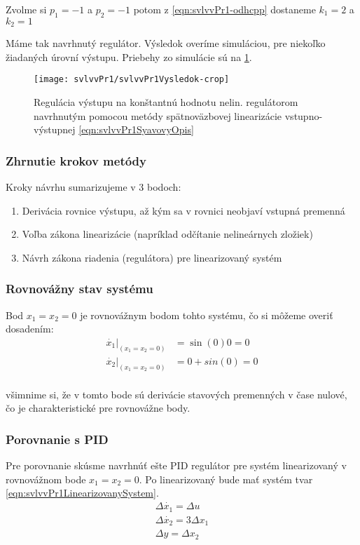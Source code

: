 \documentclass[../main.tex]{subfiles}
\begin{document}
    Zvolme si $p_1 = -1$ a $p_2 = -1$ potom z \cref{eqn:svlvvPr1-odhcpp} dostaneme $k_1=2$ a $k_2 = 1$

	Máme tak navrhnutý regulátor. Výsledok overíme simuláciou, pre niekoľko žiadaných úrovní výstupu. Priebehy zo simulácie sú na \cref{fig:svlvvPr1Vysledok}.
	\begin{figure}[h!]
		\centering
		\texttt{[image: svlvvPr1/svlvvPr1Vysledok-crop]}
		\caption{Regulácia výstupu na konštantnú hodnotu nelin. regulátorom navrhnutým pomocou metódy spätnoväzbovej linearizácie vstupno-výstupnej \cref{eqn:svlvvPr1SyavovyOpis}}
		\label{fig:svlvvPr1Vysledok}
	\end{figure}

    \subsubsection{Zhrnutie krokov metódy}
    Kroky návrhu sumarizujeme v 3 bodoch:
    \begin{enumerate}
        \item Derivácia rovnice výstupu, až kým sa v rovnici neobjaví vstupná premenná
        \item Voľba zákona linearizácie (napríklad odčítanie nelineárnych zložiek)
        \item Návrh zákona riadenia (regulátora) pre linearizovaný systém
    \end{enumerate}

    \subsubsection{Rovnovážny stav systému}
    Bod $x_1 = x_2 = 0$ je rovnovážnym bodom tohto systému, čo si môžeme overiť dosadením:
	\begin{equation*}
	    \begin{aligned}
            \dot{x_1}|_{(x_1 = x_2 = 0)} &= \sin(0) 0 = 0 \\
            \dot{x_2}|_{(x_1 = x_2 = 0)}  &= 0 + sin(0) = 0 \\
	    \end{aligned}
	    \label{eqn:svlvvPr1OverenieRB}
	\end{equation*}

	všimnime si, že v tomto bode sú derivácie stavových premenných v čase nulové, čo je charakteristické pre rovnovážne body.
    \subsubsection{Porovnanie s PID}
	Pre porovnanie skúsme navrhnúť ešte PID regulátor pre systém linearizovaný v rovnovážnom bode $x_1 = x_2 = 0$. Po linearizovaný bude mať systém tvar \cref{eqn:svlvvPr1LinearizovanySystem}. 
	\begin{equation}
	\begin{gathered}
	\Delta \dot{x_1}  = \Delta u \\
	\Delta \dot{x_2} = 3\Delta x_1 \\
	\Delta y = \Delta  x_2
	\end{gathered}
	\label{eqn:svlvvPr1LinearizovanySystem}
	\end{equation}
\end{document}
